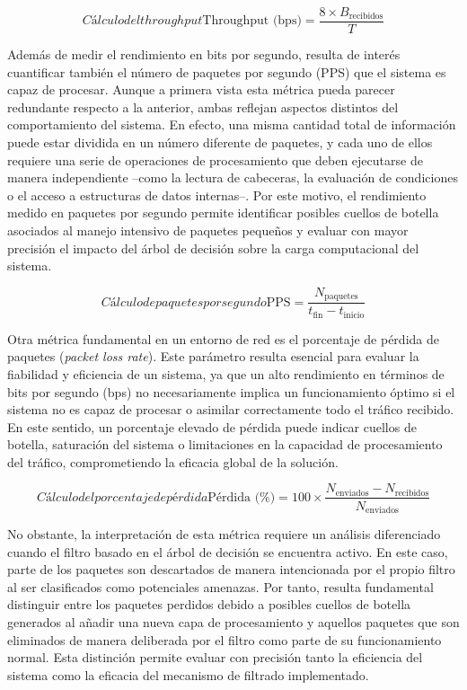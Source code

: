 \begin{equation}[eq:throughput]{Cálculo del throughput}
  \text{Throughput (bps)} = \frac{8 \times B_{\text{recibidos}}}{T}
\end{equation}

Además de medir el rendimiento en bits por segundo, resulta de interés cuantificar también el número de paquetes por segundo (PPS) que el sistema es capaz de procesar. Aunque a primera vista esta métrica pueda parecer redundante respecto a la anterior, ambas reflejan aspectos distintos del comportamiento del sistema. En efecto, una misma cantidad total de información puede estar dividida en un número diferente de paquetes, y cada uno de ellos requiere una serie de operaciones de procesamiento que deben ejecutarse de manera independiente --como la lectura de cabeceras, la evaluación de condiciones o el acceso a estructuras de datos internas--. Por este motivo, el rendimiento medido en paquetes por segundo permite identificar posibles cuellos de botella asociados al manejo intensivo de paquetes pequeños y evaluar con mayor precisión el impacto del árbol de decisión sobre la carga computacional del sistema.

\begin{equation}[eq:pps]{Cálculo de paquetes por segundo}
	\text{PPS} = \frac{N_{\text{paquetes}}}{t_{\text{fin}}-t_{\text{inicio}}}
\end{equation}

Otra métrica fundamental en un entorno de red es el porcentaje de pérdida de paquetes (\textit{packet loss rate}). Este parámetro resulta esencial para evaluar la fiabilidad y eficiencia de un sistema, ya que un alto rendimiento en términos de bits por segundo (bps) no necesariamente implica un funcionamiento óptimo si el sistema no es capaz de procesar o asimilar correctamente todo el tráfico recibido. En este sentido, un porcentaje elevado de pérdida puede indicar cuellos de botella, saturación del sistema o limitaciones en la capacidad de procesamiento del tráfico, comprometiendo la eficacia global de la solución.

\begin{equation}[eq:perdida]{Cálculo del porcentaje de pérdida}
  \text{Pérdida (\%)} = 100 \times \frac{N_{\text{enviados}} - N_{\text{recibidos}}}{N_{\text{enviados}}}
\end{equation}

No obstante, la interpretación de esta métrica requiere un análisis diferenciado cuando el filtro basado en el árbol de decisión se encuentra activo. En este caso, parte de los paquetes son descartados de manera intencionada por el propio filtro al ser clasificados como potenciales amenazas. Por tanto, resulta fundamental distinguir entre los paquetes perdidos debido a posibles cuellos de botella generados al añadir una nueva capa de procesamiento y aquellos paquetes que son eliminados de manera deliberada por el filtro como parte de su funcionamiento normal. Esta distinción permite evaluar con precisión tanto la eficiencia del sistema como la eficacia del mecanismo de filtrado implementado.

